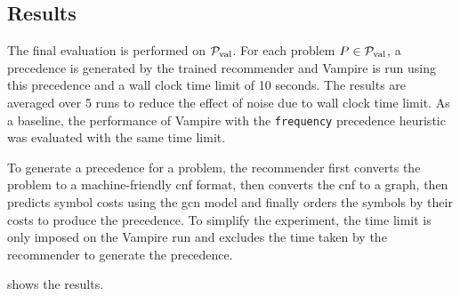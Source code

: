 
\subsection{Results}

The final evaluation is performed on $\operatorname{\mathcal{P}_{\mathrm{val}}}$.
For each problem $P \in \operatorname{\mathcal{P}_{\mathrm{val}}}$,
a precedence is generated by the trained recommender
and Vampire is run using this precedence and a wall clock time limit of 10 seconds.
The results are averaged over 5 runs to reduce the effect of noise due to wall clock time limit.
As a baseline, the performance of Vampire with the \texttt{frequency} precedence heuristic was evaluated
with the same time limit.

To generate a precedence for a problem,
the recommender first converts the problem to a machine-friendly \gls{cnf} format,
then converts the \gls{cnf} to a graph,
then predicts symbol costs using the \gls{gcn} model
and finally orders the symbols by their costs to produce the precedence.
To simplify the experiment, the time limit is only imposed on the Vampire run
and excludes the time taken by the recommender to generate the precedence.

 shows the results.

